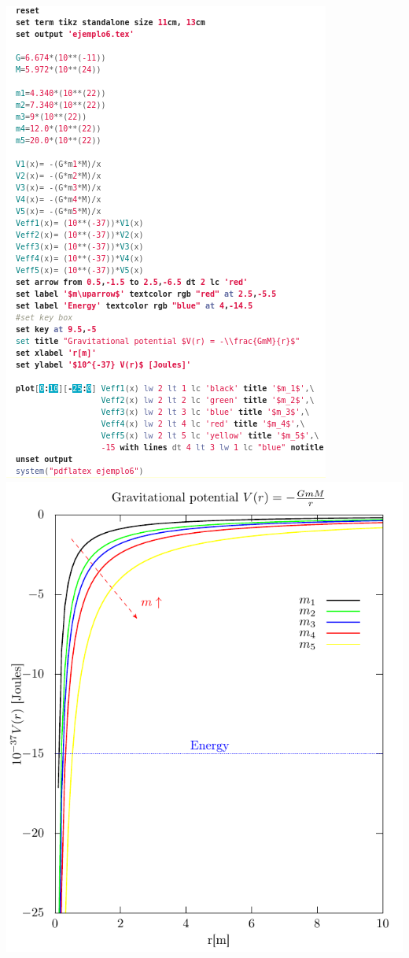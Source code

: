 \documentclass[11.5pt,a4paper]{article}
\begin{document}
\includegraphics[scale=0.40]{screen4.png}  
\includegraphics[scale=0.65]{ejemplo6.pdf}\\ 
\end{document}
